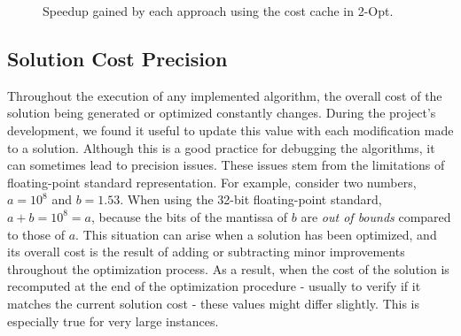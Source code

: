 \begin{figure}[htbp]
    \centering
    \caption{Speedup gained by each approach using the cost cache in 2-Opt.} \label{fig:costCacheShowcase} 
\end{figure}

\subsection{Solution Cost Precision}

Throughout the execution of any implemented algorithm, the overall cost of the solution being generated or optimized constantly changes.
During the project's development, we found it useful to update this value with each modification made to a solution.
Although this is a good practice for debugging the algorithms, it can sometimes lead to precision issues.
These issues stem from the limitations of floating-point standard representation.
For example, consider two numbers, $a=10^8$ and $b=1.53$.
When using the 32-bit floating-point standard, $a+b=10^8=a$, because the bits of the mantissa of $b$ are \textit{out of bounds} compared to those of $a$.
This situation can arise when a solution has been optimized, and its overall cost is the result of adding or subtracting minor improvements throughout the optimization process.
As a result, when the cost of the solution is recomputed at the end of the optimization procedure - usually to verify if it matches the current solution cost - these values might differ slightly. 
This is especially true for very large instances.

